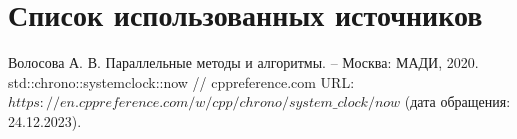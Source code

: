 \chapter*{Список использованных источников}

\begin{enumerate}
	 Волосова А. В. Параллельные методы и алгоритмы. -- Москва: МАДИ, 2020.
	 std::chrono::systemclock::now // cppreference.com URL: \newline $https://en.cppreference.com/w/cpp/chrono/system\_clock/now$ (дата обращения: 24.12.2023).
	
	
\end{enumerate}
